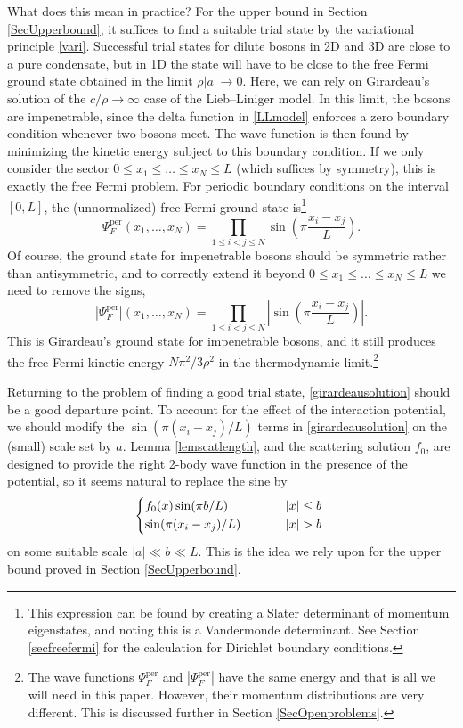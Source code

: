 \documentclass[a4paper,11pt]{article}
\newcommand{\abs}[1]{\left\lvert #1 \right\rvert}
\numberwithin{equation}{section}
\begin{document}
What does this mean in practice? For the upper bound in Section \ref{SecUpperbound}, it suffices to find a suitable trial state by the variational principle \eqref{vari}. Successful trial states for dilute bosons in 2D and 3D are close to a pure condensate, but in 1D the state will have to be close to the free Fermi ground state obtained in the limit $\rho|a|\to0$. Here, we can rely on Girardeau's solution \cite{girardeau1960relationship} of the $c/\rho\to\infty$ case of the Lieb--Liniger model. In this limit, the bosons are impenetrable, since the delta function in \eqref{LLmodel} enforces a zero boundary condition whenever two bosons meet. The wave function is then found by minimizing the kinetic energy subject to this boundary condition. If we only consider the sector $0\leq x_1\leq\dots\leq x_N\leq L$ (which suffices by symmetry), this is exactly the free Fermi problem. For periodic boundary conditions on the interval $[0,L]$, the (unnormalized) free Fermi ground state is\footnote{This expression can be found by creating a Slater determinant of momentum eigenstates, and noting this is a Vandermonde determinant. See Section \ref{secfreefermi} for the calculation for Dirichlet boundary conditions.}
\begin{equation}
\label{fermisolution}
\Psi^{\text{per}}_F(x_1,\dots,x_N)=\prod_{1\leq i<j\leq N}\sin\left(\pi\frac{x_i-x_j}{L}\right).
\end{equation}
Of course, the ground state for impenetrable bosons should be symmetric rather than antisymmetric, and to correctly extend it beyond $0\leq x_1\leq\dots\leq x_N\leq L$ we need to remove the signs,
\begin{equation}
\label{girardeausolution}
\abs{\Psi^{\text{per}}_F}(x_1,\dots,x_N)=\prod_{1\leq i<j\leq N}\abs{\sin\left(\pi\frac{x_i-x_j}{L}\right)}.
\end{equation}
This is Girardeau's ground state for impenetrable bosons, and it still produces the free Fermi kinetic energy $N\pi^2/3\rho^2$ in the thermodynamic limit.\footnote{The wave functions $\Psi^{\text{per}}_F$ and $|\Psi^{\text{per}}_F|$ have the same energy and that is all we will need in this paper. However, their momentum distributions are very different. This is discussed further in Section \ref{SecOpenproblems}.\label{momremark}} 

Returning to the problem of finding a good trial state, \eqref{girardeausolution} should be a good departure point. To account for the effect of the interaction potential, we should modify the $\sin(\pi(x_i-x_j)/L)$ terms in \eqref{girardeausolution} on the (small) scale set by $a$. Lemma \ref{lemscatlength}, and the scattering solution $f_0$, are designed to provide the right 2-body wave function in the presence of the potential, so it seems natural to replace the sine by
\begin{equation}
\label{trialidea}
\begin{cases*}
f_0(x)\sin(\pi b/L)& \phantom{when} $|x|\leq b$\\
\sin(\pi(x_i-x_j)/L)& \phantom{when} $|x|> b$
\end{cases*}
\end{equation}
on some suitable scale $\abs{a}\ll b\ll L$. This is the idea we rely upon for the upper bound proved in Section \ref{SecUpperbound}. 
\end{document}
